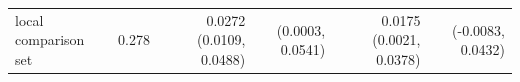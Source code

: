 \begin{tabular}{lrrrrr}
local comparison set & 0.278 & 0.0272 (0.0109, 0.0488) & (0.0003, 0.0541) & 0.0175 (0.0021, 0.0378) & (-0.0083, 0.0432) \\

\end{tabular}
